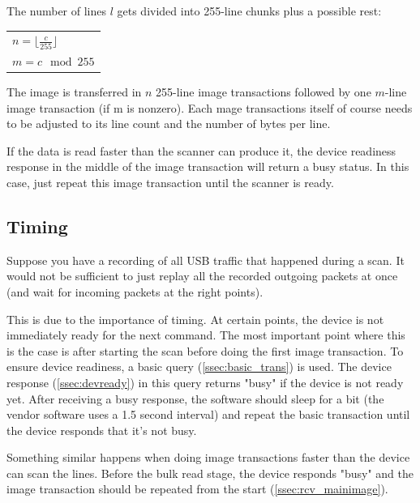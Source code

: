 \documentclass{article}
\begin{document}
The number of lines $l$ gets divided into 255-line chunks plus a possible rest:

\begin{center}
\begin{tabular}{l}
$n = \lfloor \frac{c}{255} \rfloor $ \\
$m = c \mod 255$ \\
\end{tabular}
\end{center}

The image is transferred in $n$ 255-line image transactions followed by one $m$-line
image transaction (if m is nonzero). Each mage transactions itself of course needs
to be adjusted to its line count and the number of bytes per line.

If the data is read faster than the scanner can produce it, the device readiness
response in the middle of the image transaction will return a busy status. In this case,
just repeat this image transaction until the scanner is ready.

\subsection{Timing}

Suppose you have a recording of all USB traffic that happened during a scan.
It would not be sufficient to just replay all the recorded outgoing packets
at once (and wait for incoming packets at the right points).

This is due to the importance of timing. At certain points, the device
is not immediately ready for the next command. The most important point
where this is the case is after starting the scan before doing the first
image transaction. To ensure device readiness, a basic query (\ref{ssec:basic_trans})
is used. The device response (\ref{ssec:devready}) in this query returns "busy" if the device
is not ready yet. After receiving a busy response, the software should sleep
for a bit (the vendor software uses a 1.5 second interval) and repeat the basic transaction
until the device responds that it's not busy.

Something similar happens when doing image transactions faster than the device
can scan the lines. Before the bulk read stage, the device responds "busy"
and the image transaction should be repeated from the start (\ref{ssec:rcv_mainimage}).
\end{document}
